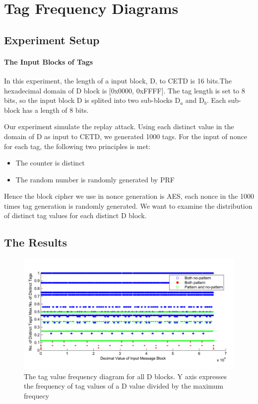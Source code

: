 \documentclass{article}
\begin{document}
\section{Tag Frequency Diagrams}
\subsection{Experiment Setup}
\paragraph{The Input Blocks of Tags}
In this experiment, the length of a input block, D, to CETD is 16 bits.The hexadecimal domain of D block is [0x0000, 0xFFFF].  The tag length is set to 8 bits, so the input block D is splited into two sub-blocks D$_a$ and D$_b$. Each sub-block has a length of 8 bits.

Our experiment simulate the replay attack. Using each distinct value in the domain of D as input to CETD, we generated 1000 tags. For the input of nonce for each tag, the following two principles is met:
\begin{itemize}
	\item The counter is distinct
	\item The random number is randomly generated by PRF
\end{itemize}
Hence the block cipher we use in nonce generation is AES, each nonce in the 1000 times tag generation is randomly generated. 
We want to examine the distribution of distinct tag values for each distinct D block. 





\subsection{The Results}
\begin{figure}[htbp]
 \centering
 \includegraphics[scale=0.6]{./frequency/pattern_no_mix_frequency_new.pdf}
 \caption{The tag value frequency diagram for all D blocks. Y axis expresses the frequency of tag values of a D value divided by the maximum frequecy}
 \label{frequency_plot }
\end{figure} 
\end{document}
